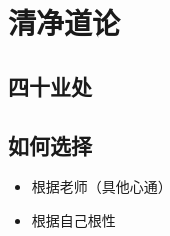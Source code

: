 \section{清净道论}


\subsection{四十业处}

\subsection{如何选择}
\begin{itemize}
  \item 根据老师（具他心通）
  \item 根据自己根性
\end{itemize}
